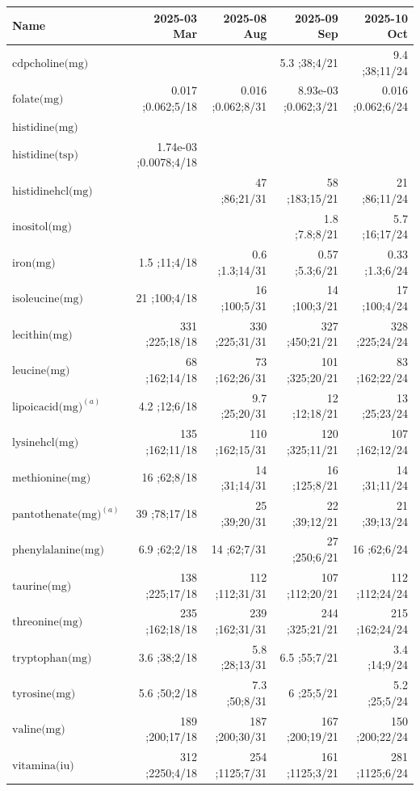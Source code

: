 \begin{table}[H]
\centering
\begin{tabular}{|l|r|r|r|r|}
\hline
Name&2025-03 Mar&2025-08 Aug&2025-09 Sep&2025-10 Oct\\
\hline
$\textrm{cdpcholine(mg)}$&&&5.3 ;38;4/21&9.4 ;38;11/24\\
$\textrm{folate(mg)}$&0.017 ;0.062;5/18&0.016 ;0.062;8/31&8.93e-03 ;0.062;3/21&0.016 ;0.062;6/24\\
$\textrm{histidine(mg)}$&&&&\\
$\textrm{histidine(tsp)}$&1.74e-03 ;0.0078;4/18&&&\\
$\textrm{histidinehcl(mg)}$&&47 ;86;21/31&58 ;183;15/21&21 ;86;11/24\\
$\textrm{inositol(mg)}$&&&1.8 ;7.8;8/21&5.7 ;16;17/24\\
$\textrm{iron(mg)}$&1.5 ;11;4/18&0.6 ;1.3;14/31&0.57 ;5.3;6/21&0.33 ;1.3;6/24\\
$\textrm{isoleucine(mg)}$&21 ;100;4/18&16 ;100;5/31&14 ;100;3/21&17 ;100;4/24\\
$\textrm{lecithin(mg)}$&331 ;225;18/18&330 ;225;31/31&327 ;450;21/21&328 ;225;24/24\\
$\textrm{leucine(mg)}$&68 ;162;14/18&73 ;162;26/31&101 ;325;20/21&83 ;162;22/24\\
$\textrm{lipoicacid(mg)}^{\left(a\right)}$&4.2 ;12;6/18&9.7 ;25;20/31&12 ;12;18/21&13 ;25;23/24\\
$\textrm{lysinehcl(mg)}$&135 ;162;11/18&110 ;162;15/31&120 ;325;11/21&107 ;162;12/24\\
$\textrm{methionine(mg)}$&16 ;62;8/18&14 ;31;14/31&16 ;125;8/21&14 ;31;11/24\\
$\textrm{pantothenate(mg)}^{\left(a\right)}$&39 ;78;17/18&25 ;39;20/31&22 ;39;12/21&21 ;39;13/24\\
$\textrm{phenylalanine(mg)}$&6.9 ;62;2/18&14 ;62;7/31&27 ;250;6/21&16 ;62;6/24\\
$\textrm{taurine(mg)}$&138 ;225;17/18&112 ;112;31/31&107 ;112;20/21&112 ;112;24/24\\
$\textrm{threonine(mg)}$&235 ;162;18/18&239 ;162;31/31&244 ;325;21/21&215 ;162;24/24\\
$\textrm{tryptophan(mg)}$&3.6 ;38;2/18&5.8 ;28;13/31&6.5 ;55;7/21&3.4 ;14;9/24\\
$\textrm{tyrosine(mg)}$&5.6 ;50;2/18&7.3 ;50;8/31&6 ;25;5/21&5.2 ;25;5/24\\
$\textrm{valine(mg)}$&189 ;200;17/18&187 ;200;30/31&167 ;200;19/21&150 ;200;22/24\\
$\textrm{vitamina(iu)}$&312 ;2250;4/18&254 ;1125;7/31&161 ;1125;3/21&281 ;1125;6/24\\

\end{tabular}
\end{table}
